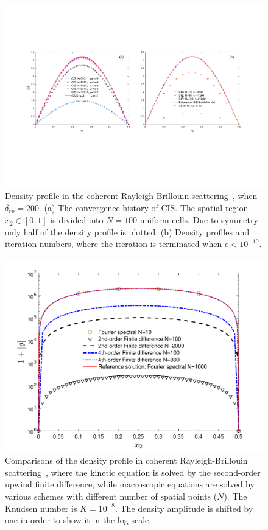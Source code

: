 \begin{figure}[pt]
	\centering
	\includegraphics[width=1\columnwidth]{GSIS/IMG/Ke_5fs_resonant.pdf}
	\caption{Density profile in the coherent Rayleigh-Brillouin scattering~\cite{Su2020SIAM}, when $\delta_{rp}=200$. (a) The convergence history of CIS. The spatial region $x_2\in[0,1]$ is divided into $N=100$ uniform cells. Due to symmetry only half of the density profile is plotted.  (b) Density profiles and iteration numbers, where the iteration is terminated when $\epsilon<10^{-10}$. }
	\label{fig:CRBS_K_005}
\end{figure}

\begin{figure}[t]
	\centering
	\includegraphics[width=0.7\columnwidth]{GSIS/IMG/crbsKn1e_8.pdf}
	\caption{Comparisons of the density profile in coherent Rayleigh-Brillouin scattering~\cite{Su2020SIAM}, where the kinetic equation is solved by the second-order upwind finite difference, while macroscopic equations are solved by various schemes with different number of spatial points ($N$). The Knudsen number is $K=10^{-8}$. The density amplitude is shifted by one in order to show it in the log scale. }
	\label{fig:crbsKn1e-8}
\end{figure}


